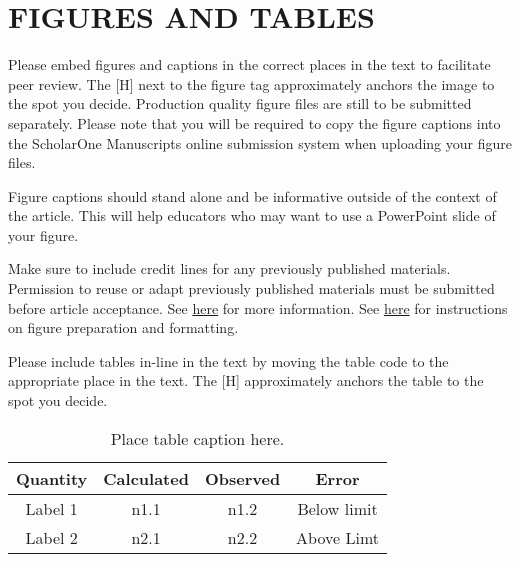 \documentclass[12pt]{article}
\begin{document}
\section*{\sffamily \Large FIGURES AND TABLES}
Please embed figures and captions in the correct places in the text to facilitate peer review. The [H] next to the figure tag approximately anchors the image to the spot you decide. Production quality figure files are still to be submitted separately. Please note that you will be required to copy the figure captions into the ScholarOne Manuscripts online submission system when uploading your figure files.

Figure captions should stand alone and be informative outside of the context of the article. This will help educators who may want to use a PowerPoint slide of your figure. 

Make sure to include credit lines for any previously published materials. Permission to reuse or adapt previously published materials must be submitted before article acceptance. See \href{http://wires.wiley.com/WileyCDA/Section/id-398153.html#Resources}{here} for more information. See \href{http://media.wiley.com/assets/7315/44/Figure_preparation.pdf}{here} for instructions on figure preparation and formatting.

Please include tables in-line in the text by moving the table code to the appropriate place in the text. The [H] approximately anchors the table to the spot you decide.
\begin{table}[H]
	\centering
	\begin{tabular}{|c|c|c|c|}\hline
		\textbf{Quantity} & \textbf{Calculated} & \textbf{Observed} & \textbf{Error} \\ \hline
		Label 1 & n1.1 & n1.2 & Below limit \\ \hline
		Label 2 & n2.1 & n2.2 & Above Limt \\ \hline
	\end{tabular}
	\caption{\label{tbl1} Place table caption here.}
\end{table}
\end{document}
